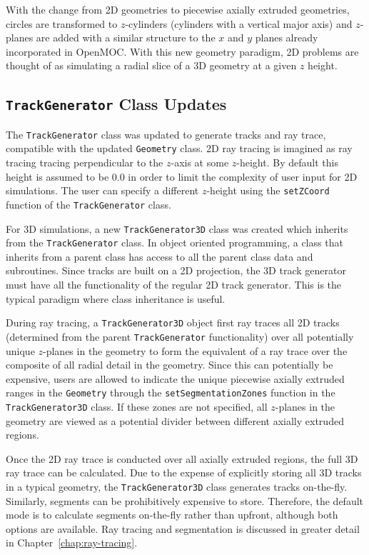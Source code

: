 With the change from 2D geometries to piecewise axially extruded geometries, circles are transformed to $z$-cylinders (cylinders with a vertical major axis) and $z$-planes are added with a similar structure to the $x$ and $y$ planes already incorporated in OpenMOC. With this new geometry paradigm, 2D problems are thought of as simulating a radial slice of a 3D geometry at a given $z$ height. 

\subsection{\texttt{TrackGenerator} Class Updates}
\label{sec:oo-trackgenerator}

The \texttt{TrackGenerator} class was updated to generate tracks and ray trace, compatible with the updated \texttt{Geometry} class. 2D ray tracing is imagined as ray tracing tracing perpendicular to the $z$-axis at some $z$-height. By default this height is assumed to be 0.0 in order to limit the complexity of user input for 2D simulations. The user can specify a different $z$-height using the \texttt{setZCoord} function of the \texttt{TrackGenerator} class.

For 3D simulations, a new \texttt{TrackGenerator3D} class was created which inherits from the \texttt{TrackGenerator} class. In object oriented programming, a class that inherits from a parent class has access to all the parent class data and subroutines. Since tracks are built on a 2D projection, the 3D track generator must have all the functionality of the regular 2D track generator. This is the typical paradigm where class inheritance is useful. 

During ray tracing, a \texttt{TrackGenerator3D} object first ray traces all 2D tracks (determined from the parent \texttt{TrackGenerator} functionality) over all potentially unique $z$-planes in the geometry to form the equivalent of a ray trace over the composite of all radial detail in the geometry. Since this can potentially be expensive, users are allowed to indicate the unique piecewise axially extruded ranges in the \texttt{Geometry} through the \texttt{setSegmentationZones} function in the \texttt{TrackGenerator3D} class. If these zones are not specified, all $z$-planes in the geometry are viewed as a potential divider between different axially extruded regions.

Once the 2D ray trace is conducted over all axially extruded regions, the full 3D ray trace can be calculated. Due to the expense of explicitly storing all 3D tracks in a typical geometry, the \texttt{TrackGenerator3D} class generates tracks on-the-fly. Similarly, segments can be prohibitively expensive to store. Therefore, the default mode is to calculate segments on-the-fly rather than upfront, although both options are available. Ray tracing and segmentation is discussed in greater detail in Chapter~\ref{chap:ray-tracing}.

